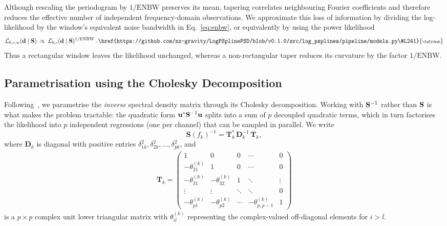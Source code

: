 \documentclass[%
	reprint,
	nofootinbib,
	amsmath,
	amssymb,
	aps,
]{revtex4-2}
\DeclareRobustCommand{\codelink}[1]{\,\href{#1}{\mbox{\scalebox{0.65}{\faGithub}}}}
\renewcommand{\d}{{\bf d}}
\renewcommand{\S}{{\bf S}}
\renewcommand{\u}{\mathbf {u}}
\begin{document}
	Although rescaling the periodogram by $1/\mathrm{ENBW}$ preserves its mean,
	tapering correlates neighbouring Fourier coefficients and therefore reduces
	the effective number of independent frequency-domain observations. We
	approximate this loss of information by dividing the log-likelihood by the
	window's equivalent noise bandwidth in Eq.~\eqref{eq:enbw}, or equivalently
	by using the power likelihood
	\begin{equation}
		\label{eq:enbw-likelihood}
		\mathcal{L}_{b,c,w}(\d\mid\S)
		\;\propto\; \mathcal{L}_{b,c}(\d\mid\S)^{1/\mathrm{ENBW}}\, .
		\codelink{https://github.com/nz-gravity/LogPSplinePSD/blob/v0.1.0/src/log_psplines/pipeline/models.py\#L241}
	\end{equation}
	Thus a rectangular window leaves the likelihood unchanged, whereas a
	non-rectangular taper reduces its curvature by the factor
	$1/\mathrm{ENBW}$.

	\subsection{Parametrisation using the Cholesky Decomposition}
	\label{subsec:cholesky}
	Following~\citet{RosenOri2007Aeom,Hu2023}, we parametrise the
	\emph{inverse} spectral density matrix through its Cholesky decomposition.
	Working with $\S^{-1}$ rather than $\S$ is what makes the problem
	tractable: the quadratic form $\u^{*}\S^{-1}\u$ splits into a sum of $p$
	decoupled quadratic terms, which in turn factorises the likelihood into
	$p$ independent regressions (one per channel) that can be sampled in
	parallel. We write
	\begin{equation}
		\mathbf{S}(f_{k})^{-1}= \mathbf{T}_{k}^{*} \, \mathbf{D}_{k}^{-1}\, \mathbf{T}_{k},
	\end{equation}
	where $\mathbf{D}_{k}$ is diagonal with positive entries
	$\delta_{1k}^{2}, \delta_{2k}^{2}, \ldots, \delta_{pk}^{2}$, and
	\begin{align}
		\mathbf{T}_{k} = \begin{pmatrix}1&0&0&\cdots&0 \\ -\theta_{21}^{(k)}&1&0&\cdots&0 \\ -\theta_{31}^{(k)}&-\theta_{32}^{(k)}&1&\ddots&\vdots \\ \vdots&\vdots&\ddots&\ddots&0 \\ -\theta_{p1}^{(k)}&-\theta_{p2}^{(k)}&\cdots&-\theta_{p,p-1}^{(k)}&1\end{pmatrix}
	\end{align}
	is a $p \times p$ complex unit lower triangular matrix with
	$\theta_{il}^{(k)}$ representing the complex-valued off-diagonal elements for
	$i > l$.
\end{document}
